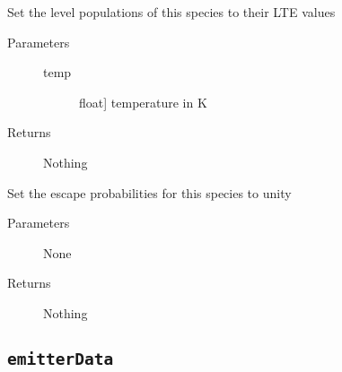 \documentclass[letterpaper,10pt,english]{sphinxmanual}
\begin{document}
\begin{fulllineitems}
\begin{fulllineitems}
\begin{description}
\end{description}

\end{fulllineitems}


\begin{fulllineitems}
\label{fulldoc:despotic.emitter.setLevPopLTE}
Set the level populations of this species to their LTE values
\begin{description}
\item[{Parameters}] \leavevmode\begin{description}
\item[{temp}] \leavevmode{[}float{]}
temperature in K

\end{description}

\item[{Returns}] \leavevmode
Nothing

\end{description}

\end{fulllineitems}


\begin{fulllineitems}
\label{fulldoc:despotic.emitter.setThin}
Set the escape probabilities for this species to unity
\begin{description}
\item[{Parameters}] \leavevmode
None

\item[{Returns}] \leavevmode
Nothing

\end{description}

\end{fulllineitems}


\end{fulllineitems}



\subsection{\texttt{emitterData}}
\label{fulldoc:emitterdata}\label{fulldoc:sssec-full-emitterdata}
\end{document}
